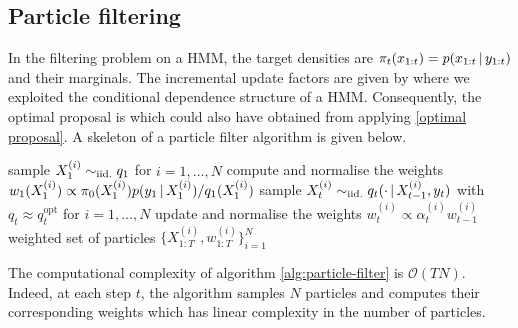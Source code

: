 \subsection{Particle filtering}
In the filtering problem on a HMM, the target densities are $\pi_{t}(x_{1:t})=p(x_{1:t}\,|\, y_{1:t})$ and their marginals. The incremental update factors are given by
where we exploited the conditional dependence structure of a HMM. Consequently, the optimal proposal is
which could also have obtained from applying \eqref{optimal proposal}. A skeleton of a particle filter algorithm is given below.
%
\begin{algorithm}[!h]\small
	\caption{\label{alg:particle-filter}}
	\begin{algorithmic}[1]
		\State sample $X_{1}^{(i)}\sim_{\mathrm{iid.}} q_{1}$ for $i=1,\dots,N$	%
		\State compute and normalise the weights $w_{1}(X^{(i)}_{1})\propto {\pi_{0}( X^{(i)}_{1})p(y_{1}\,|\,X^{(i)}_{1})/ q_{1}(X^{(i)}_{1})}$
			\State sample $X^{(i)}_{t}\sim_{\mathrm{iid.}} q_{t}( \cdot \,|\, X^{(i)}_{t-1}, y_{t})$ with $q_{t}\approx q_{t}^{\text{opt}}$ for $i=1,\dots,N$
			\State update and normalise the weights $w^{(i)}_{t}\propto\alpha^{(i)}_{t}w^{(i)}_{t-1}$
		\EndFor\\
		\Return weighted set of particles $\{X^{(i)}_{1:T},w^{(i)}_{1:T}\}_{i=1}^{N}$
	\end{algorithmic}
\end{algorithm}
%

The computational complexity of algorithm \ref{alg:particle-filter} is $\mathcal O(TN)$. Indeed, at each step $t$,  the algorithm samples $N$ particles and computes their corresponding weights which has linear complexity in the number of particles.

